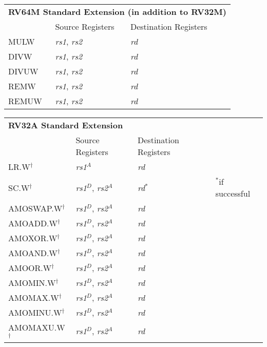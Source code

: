 \begin{tabular}{p{25mm}|p{3cm}|p{6cm}|p{10cm}}
  \multicolumn{4}{l}{\bf RV64M Standard Extension (in addition to RV32M)} \\
  \cline{2-3}
   & Source Registers & Destination Registers \\
  \cline{2-3}
   MULW & {\em rs1}, {\em rs2} & {\em rd} &  \\
   \cline{2-3}
   DIVW & {\em rs1}, {\em rs2} & {\em rd} &  \\
   \cline{2-3}
   DIVUW & {\em rs1}, {\em rs2} & {\em rd} &  \\
   \cline{2-3}
   REMW & {\em rs1}, {\em rs2} & {\em rd} &  \\
   \cline{2-3}
   REMUW & {\em rs1}, {\em rs2} & {\em rd} &  \\
   \cline{2-3}
\end{tabular}

\begin{tabular}{p{25mm}|p{3cm}|p{6cm}|p{10cm}}
  \multicolumn{4}{l}{\bf RV32A Standard Extension} \\
  \cline{2-3}
   & Source Registers & Destination Registers \\
  \cline{2-3}
   LR.W$^\dagger$ & {\em rs1}$^A$ & {\em rd} &  \\
   \cline{2-3}
   SC.W$^\dagger$ & {\em rs1}$^D$, {\em rs2}$^A$ & {\em rd}$^*$ & $^*$if successful \\
   \cline{2-3}
   AMOSWAP.W$^\dagger$ & {\em rs1}$^D$, {\em rs2}$^A$ & {\em rd} &  \\
   \cline{2-3}
   AMOADD.W$^\dagger$ & {\em rs1}$^D$, {\em rs2}$^A$ & {\em rd} &  \\
   \cline{2-3}
   AMOXOR.W$^\dagger$ & {\em rs1}$^D$, {\em rs2}$^A$ & {\em rd} &  \\
   \cline{2-3}
   AMOAND.W$^\dagger$ & {\em rs1}$^D$, {\em rs2}$^A$ & {\em rd} &  \\
   \cline{2-3}
   AMOOR.W$^\dagger$ & {\em rs1}$^D$, {\em rs2}$^A$ & {\em rd} &  \\
   \cline{2-3}
   AMOMIN.W$^\dagger$ & {\em rs1}$^D$, {\em rs2}$^A$ & {\em rd} &  \\
   \cline{2-3}
   AMOMAX.W$^\dagger$ & {\em rs1}$^D$, {\em rs2}$^A$ & {\em rd} &  \\
   \cline{2-3}
   AMOMINU.W$^\dagger$ & {\em rs1}$^D$, {\em rs2}$^A$ & {\em rd} &  \\
   \cline{2-3}
   AMOMAXU.W$^\dagger$ & {\em rs1}$^D$, {\em rs2}$^A$ & {\em rd} &  \\
   \cline{2-3}
\end{tabular}

